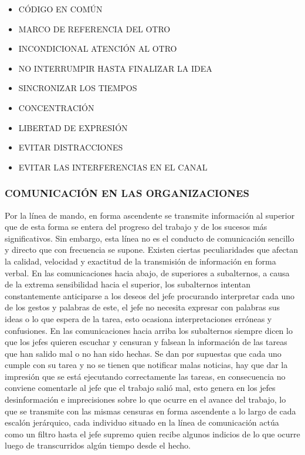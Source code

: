 \begin{itemize}
  \item CÓDIGO EN COMÚN
  \item MARCO DE REFERENCIA DEL OTRO
  \item INCONDICIONAL ATENCIÓN AL OTRO
  \item NO INTERRUMPIR HASTA FINALIZAR LA IDEA
  \item SINCRONIZAR LOS TIEMPOS
  \item CONCENTRACIÓN
  \item LIBERTAD DE EXPRESIÓN
  \item EVITAR DISTRACCIONES
  \item EVITAR LAS INTERFERENCIAS EN EL CANAL
\end{itemize}


\subsubsection*{COMUNICACIÓN EN LAS ORGANIZACIONES}
Por la línea de mando, en forma ascendente se transmite información al superior que de esta forma se entera del progreso del trabajo y de los sucesos más significativos. Sin embargo, esta línea no es el conducto de comunicación sencillo y directo que con frecuencia se supone. Existen ciertas peculiaridades que afectan la calidad, velocidad y exactitud de la transmisión de información en forma verbal. En las comunicaciones hacia abajo, de superiores a subalternos, a causa de la extrema sensibilidad hacia el superior, los subalternos intentan constantemente anticiparse a los deseos del jefe procurando interpretar cada uno de los gestos y palabras de este, el jefe no necesita expresar con palabras sus ideas o lo que espera de la tarea, esto ocasiona interpretaciones erróneas y confusiones. En las comunicaciones hacia arriba los subalternos siempre dicen lo que los jefes quieren escuchar y censuran y falsean la información de las tareas que han salido mal o no han sido hechas. Se dan por supuestas que cada uno cumple con su tarea y no se tienen que notificar malas noticias, hay que dar la impresión que se está ejecutando correctamente las tareas, en consecuencia no conviene comentarle al jefe que el trabajo salió mal, esto genera en los jefes desinformación e imprecisiones sobre lo que ocurre en el avance del trabajo, lo que se transmite con las mismas censuras en forma ascendente a lo largo de cada escalón jerárquico, cada individuo situado en la línea de comunicación actúa como un filtro hasta el jefe supremo quien recibe algunos indicios de lo que ocurre luego de transcurridos algún tiempo desde el hecho.

